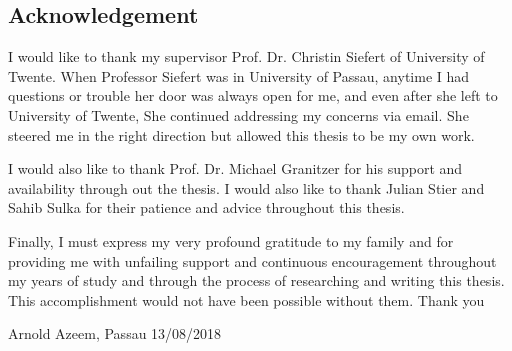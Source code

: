 \begin{titlepage}
\begin{abstract}
\end{abstract}

\section*{Acknowledgement}
I would like to thank my supervisor Prof. Dr. Christin Siefert of University of Twente. When Professor Siefert was in University of Passau, anytime I had questions or trouble her door was always open for me, and even after she left to University of Twente, She continued addressing my concerns via email. She steered me in the right direction but allowed this thesis to be my own work.

I would also like to thank Prof. Dr. Michael Granitzer for his support and availability through out the thesis. I would also like to thank Julian Stier and Sahib Sulka for their patience and advice throughout this thesis.

Finally, I must express my very profound gratitude to my family and for providing me with unfailing support and continuous encouragement throughout my years of study and through the process of researching and writing this thesis. This accomplishment would not have been possible without them. Thank you

Arnold Azeem, Passau 13/08/2018

\end{titlepage}